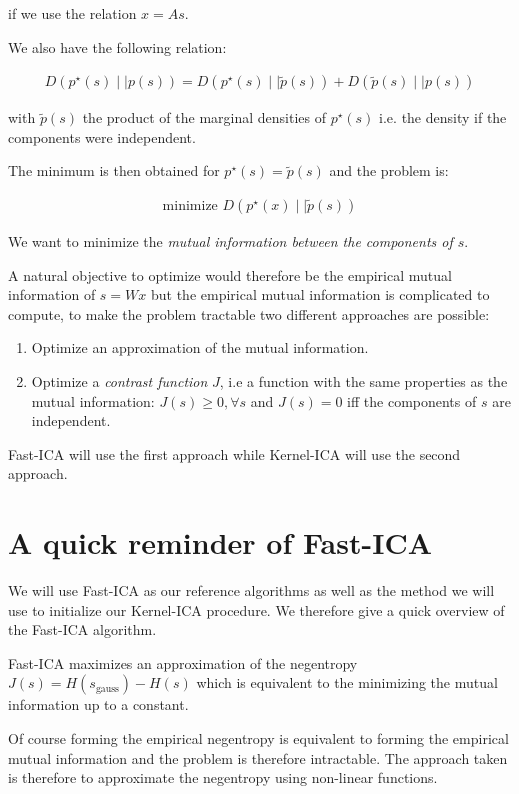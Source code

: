 \documentclass[a4paper,BCOR=5mm,oneside,openany]{scrreprt}
\begin{document}
if we use the relation $x = A s$.

We also have the following relation:

\begin{align*}
	D(p^\star(s) \mid \mid p(s)) = D(p^\star(s) \mid \mid \tilde{p}(s)) + D( \tilde{p}(s) \mid \mid p(s))
\end{align*}

with $\tilde{p}(s)$ the product of the marginal densities of $p^\star(s)$ i.e. the density if the components were independent.

The minimum is then obtained for $p^\star(s) = \tilde{p}(s)$ and the problem is:

\begin{align*}
	\text{minimize } D \left(p^\star(x) \mid \mid \tilde{p}(s) \right)
\end{align*}

We want to minimize the \emph{mutual information between the components of $s$}.

A natural objective to optimize would therefore be the empirical mutual information of $s = W x$ but the empirical mutual information is complicated to compute, to make the problem tractable two different approaches are possible:

\begin{enumerate}
	\item Optimize an approximation of the mutual information.
	\item Optimize a \emph{contrast function} $J$, i.e a function with the same properties as the mutual information: $J(s) \geq 0, \forall s$ and $J(s) = 0$ iff the components of $s$ are independent.
\end{enumerate}

Fast-ICA will use the first approach while Kernel-ICA will use the second approach.

\chapter{A quick reminder of Fast-ICA}

We will use Fast-ICA as our reference algorithms as well as the method we will use to initialize our Kernel-ICA procedure. We therefore give a quick overview of the Fast-ICA algorithm.

Fast-ICA maximizes an approximation of the negentropy $J(s) = H(s_\text{gauss}) - H(s)$ which is equivalent to the minimizing the mutual information up to a constant.

Of course forming the empirical negentropy is equivalent to forming the empirical mutual information and the problem is therefore intractable. The approach taken is therefore to approximate the negentropy using non-linear functions.
\end{document}
